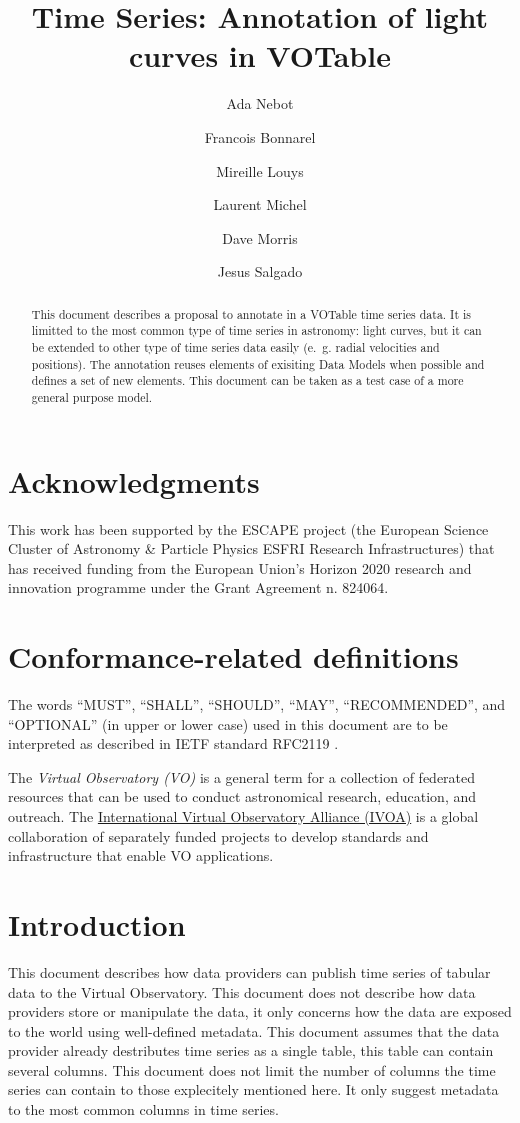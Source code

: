 \documentclass[11pt,a4paper]{ivoa}
\title{Time Series: Annotation of light curves in VOTable}
\author[http://www.ivoa.net/twiki/bin/view/IVOA/AdaNebot]{Ada Nebot}
\author[http://www.ivoa.net/twiki/bin/view/IVOA/FrancoisBonnarel]{Francois Bonnarel}
\author[http://www.ivoa.net/twiki/bin/view/IVOA/MireilleLouys]{Mireille Louys}
\author[http://www.ivoa.net/twiki/bin/view/IVOA/LaurentMichel]{Laurent Michel}
\author[http://www.ivoa.net/twiki/bin/view/IVOA/DaveMorris]{Dave Morris}
\author[http://www.ivoa.net/twiki/bin/view/IVOA/JesusSalgado]{Jesus Salgado}
\begin{document}
\begin{abstract}
  This document describes a proposal to annotate in a VOTable time series data. It is limitted to the most common type of time series in astronomy: light curves, but it can be extended to other type of time series data easily (e.~g. radial velocities and positions). The annotation reuses elements of exisiting Data Models when possible and defines a set of new elements. This document can be taken as a test case of a more general purpose model. 
\end{abstract}

\section*{Acknowledgments}
This work has been supported by the ESCAPE project (the European Science Cluster of Astronomy \& Particle Physics ESFRI Research Infrastructures) that has received funding from the European Union’s Horizon 2020 research and innovation programme under the Grant Agreement n. 824064.

\section*{Conformance-related definitions}

The words ``MUST'', ``SHALL'', ``SHOULD'', ``MAY'', ``RECOMMENDED'', and
``OPTIONAL'' (in upper or lower case) used in this document are to be
interpreted as described in IETF standard RFC2119 \citep{std:RFC2119}.

The \emph{Virtual Observatory (VO)} is a
general term for a collection of federated resources that can be used
to conduct astronomical research, education, and outreach.
The \href{http://www.ivoa.net}{International
Virtual Observatory Alliance (IVOA)} is a global
collaboration of separately funded projects to develop standards and
infrastructure that enable VO applications.


\section{Introduction}
This document describes how data providers can publish time series of tabular data to the Virtual Observatory. This document does not describe how data providers store or manipulate the data, it only concerns how the data are exposed to the world using well-defined metadata. This document assumes that the data provider already destributes time series as a single table, this table can contain several columns. This document does not limit the number of columns the time series can contain to those explecitely mentioned here. It only suggest metadata to the most common columns in time series.  
\end{document}
